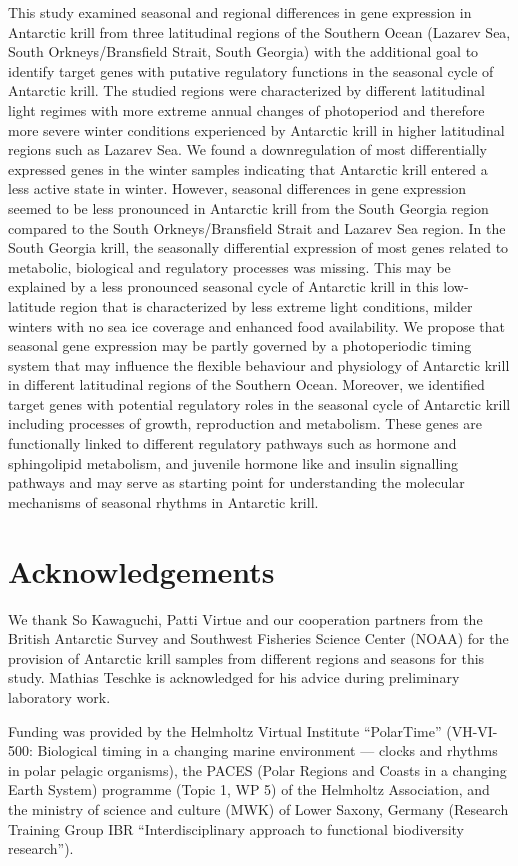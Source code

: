 This study examined seasonal and regional differences in gene expression in
Antarctic krill from three latitudinal regions of the Southern Ocean (Lazarev
Sea, South Orkneys/Bransfield Strait, South Georgia) with the additional goal
to identify target genes with putative regulatory functions in the seasonal
cycle of Antarctic krill. The studied regions were characterized by different
latitudinal light regimes with more extreme annual changes of photoperiod and
therefore more severe winter conditions experienced by Antarctic krill in
higher latitudinal regions such as Lazarev Sea. We found a downregulation of
most differentially expressed genes in the winter samples indicating that
Antarctic krill entered a less active state in winter. However, seasonal
differences in gene expression seemed to be less pronounced in Antarctic krill
from the South Georgia region compared to the South Orkneys/Bransfield Strait
and Lazarev Sea region. In the South Georgia krill, the seasonally differential
expression of most genes related to metabolic, biological and regulatory
processes was missing. This may be explained by a less pronounced seasonal
cycle of Antarctic krill in this low-latitude region that is characterized by
less extreme light conditions, milder winters with no sea ice coverage and
enhanced food availability. We propose that seasonal gene expression may be
partly governed by a photoperiodic timing system that may influence the
flexible behaviour and physiology of Antarctic krill in different latitudinal
regions of the Southern Ocean. Moreover, we identified target genes with
potential regulatory roles in the seasonal cycle of Antarctic krill including
processes of growth, reproduction and metabolism. These genes are functionally
linked to different regulatory pathways such as hormone and sphingolipid
metabolism, and juvenile hormone like and insulin signalling pathways and may
serve as starting point for understanding the molecular mechanisms of seasonal
rhythms in Antarctic krill.

\section{Acknowledgements}

We thank So Kawaguchi, Patti Virtue and our cooperation partners from the
British Antarctic Survey and Southwest Fisheries Science Center (NOAA) for the
provision of Antarctic krill samples from different regions and seasons for
this study. Mathias Teschke is acknowledged for his advice during preliminary
laboratory work.

Funding was provided by the Helmholtz Virtual Institute “PolarTime” (VH-VI-500:
Biological timing in a changing marine environment — clocks and rhythms in
polar pelagic organisms), the PACES (Polar Regions and Coasts in a changing
Earth System) programme (Topic 1, WP 5) of the Helmholtz Association, and the
ministry of science and culture (MWK) of Lower Saxony, Germany (Research
Training Group IBR “Interdisciplinary approach to functional biodiversity
research”).

\printbibliography[heading=subbibliography]
